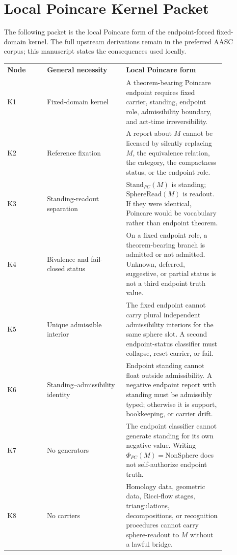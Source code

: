 \documentclass[11pt]{article}
\newcommand{\StandPC}{\mathrm{Stand}_{PC}}
\newcommand{\SphereRead}{\mathrm{SphereRead}}
\newcommand{\NonSphere}{\mathrm{NonSphere}}
\newcommand{\PhiPC}{\Phi_{PC}}
\begin{document}
\section{Local Poincare Kernel Packet}\label{sec:kernel-packet}

The following packet is the local Poincare form of the endpoint-forced fixed-domain kernel. The full upstream derivations remain in the preferred AASC corpus; this manuscript states the consequences used locally.

\begin{longtable}{L{0.16\linewidth}L{0.32\linewidth}L{0.40\linewidth}}
\toprule
\textbf{Node} & \textbf{General necessity} & \textbf{Local Poincare form}\\
\midrule
K1 & Fixed-domain kernel & A theorem-bearing Poincare endpoint requires fixed carrier, standing, endpoint role, admissibility boundary, and act-time irreversibility.\\
K2 & Reference fixation & A report about \(M\) cannot be licensed by silently replacing \(M\), the equivalence relation, the category, the compactness status, or the endpoint role.\\
K3 & Standing-readout separation & \(\StandPC(M)\) is standing; \(\SphereRead(M)\) is readout. If they were identical, Poincare would be vocabulary rather than endpoint theorem.\\
K4 & Bivalence and fail-closed status & On a fixed endpoint role, a theorem-bearing branch is admitted or not admitted. Unknown, deferred, suggestive, or partial status is not a third endpoint truth value.\\
K5 & Unique admissible interior & The fixed endpoint cannot carry plural independent admissibility interiors for the same sphere slot. A second endpoint-status classifier must collapse, reset carrier, or fail.\\
K6 & Standing--admissibility identity & Endpoint standing cannot float outside admissibility. A negative endpoint report with standing must be admissibly typed; otherwise it is support, bookkeeping, or carrier drift.\\
K7 & No generators & The endpoint classifier cannot generate standing for its own negative value. Writing \(\PhiPC(M)=\NonSphere\) does not self-authorize endpoint truth.\\
K8 & No carriers & Homology data, geometric data, Ricci-flow stages, triangulations, decompositions, or recognition procedures cannot carry sphere-readout to \(M\) without a lawful bridge.\\

\end{longtable}
\end{document}
